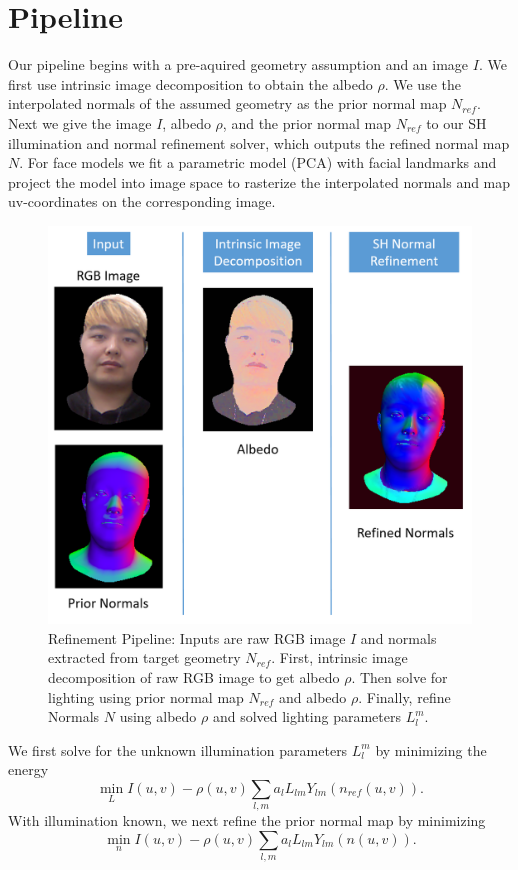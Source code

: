 \documentclass[10pt,twocolumn,letterpaper]{article}
\begin{document}
\section{Pipeline} 
Our pipeline begins with a pre-aquired geometry assumption and an image $I$. We first use intrinsic image decomposition to obtain the albedo $\rho$. We use the interpolated normals of the assumed geometry as the prior normal map $N_{ref}$. Next we give the image $I$, albedo $\rho$, and the prior normal map $N_{ref}$ to our SH illumination and normal refinement solver, which outputs the refined normal map $N$. For face models we fit a parametric model (PCA) with facial landmarks\cite{pca} and project the model into image space to rasterize the interpolated normals and map uv-coordinates on the corresponding image.
\begin{figure}[!h]
    \begin{center}
        \includegraphics [scale=0.25] {image/refine_pipeline.png}
    \end{center}
    \caption{Refinement Pipeline: Inputs are raw RGB image $I$ and normals extracted from target geometry $N_{ref}$. First, intrinsic image decomposition of raw RGB image to get albedo $\rho$. Then solve for lighting using prior normal map $N_{ref}$ and albedo $\rho$. Finally, refine Normals $N$ using albedo $\rho$ and solved lighting parameters $L_l^m$.}
    \label{fig:pipe2}
\end{figure} 
We first solve for the unknown illumination parameters $L_l^m$ by minimizing the energy
\begin{equation}
\min_{L} I(u,v) - \rho(u,v) \sum_{l,m} a_l L_{lm} Y_{lm}(n_{ref}(u,v)).
\end{equation}
With illumination known, we next refine the prior normal map by minimizing
\begin{equation}
\min_{n} I(u,v) - \rho(u,v) \sum_{l,m} a_l L_{lm} Y_{lm}(n(u,v)).
\end{equation}
\end{document}
